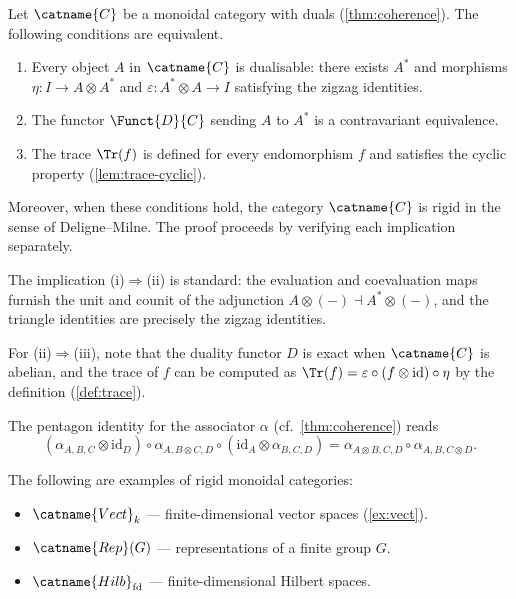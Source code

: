 \documentclass{article}
\numberwithin{equation}{section}
\begin{document}
\begin{theorem}\label{thm:long}
Let $\catname{C}$ be a monoidal category with duals
(\cref{thm:coherence}).  The following
conditions are equivalent.

\begin{enumerate}[label=(\roman*)]
  \item Every object $A$ in $\catname{C}$ is dualisable: there exists
    $A^*$ and morphisms $\eta\colon I \to A \otimes A^*$ and
    $\varepsilon\colon A^* \otimes A \to I$ satisfying the zigzag
    identities.
  \item The functor $\Funct{D}{C}$ sending $A$ to $A^*$ is a
    contravariant equivalence.
  \item The trace $\Tr(f)$ is defined for every endomorphism $f$
    and satisfies the cyclic property (\cref{lem:trace-cyclic}).
\end{enumerate}

Moreover, when these conditions hold, the category $\catname{C}$ is
rigid in the sense of Deligne--Milne.  The proof proceeds by verifying
each implication separately.

The implication (i)$\Rightarrow$(ii) is standard: the evaluation and
coevaluation maps furnish the unit and counit of the adjunction
$A \otimes (-) \dashv A^* \otimes (-)$, and the triangle identities
are precisely the zigzag identities.

For (ii)$\Rightarrow$(iii), note that the duality functor $D$ is
exact when $\catname{C}$ is abelian, and the trace of $f$ can be
computed as $\Tr(f) = \varepsilon \circ (f \otimes \mathrm{id}) \circ \eta$
by the definition (\cref{def:trace}).
\end{theorem}

\begin{proposition}\label{prop:endmath}
The pentagon identity for the associator $\alpha$
(cf.\ \cref{thm:coherence}) reads
\begin{equation}\label{eq:pentagon}
  (\alpha_{A,B,C} \otimes \mathrm{id}_D)
  \circ \alpha_{A,B \otimes C,D}
  \circ (\mathrm{id}_A \otimes \alpha_{B,C,D})
  = \alpha_{A \otimes B,C,D} \circ \alpha_{A,B,C \otimes D}.
\end{equation}
\end{proposition}

\begin{lemma}\label{lem:endlist}
The following are examples of rigid monoidal categories:
\begin{itemize}
  \item $\catname{Vect}_k$ — finite-dimensional vector spaces (\cref{ex:vect}).
  \item $\catname{Rep}(G)$ — representations of a finite group $G$.
  \item $\catname{Hilb}_{\mathrm{fd}}$ — finite-dimensional Hilbert spaces.
\end{itemize}
\end{lemma}
\end{document}
